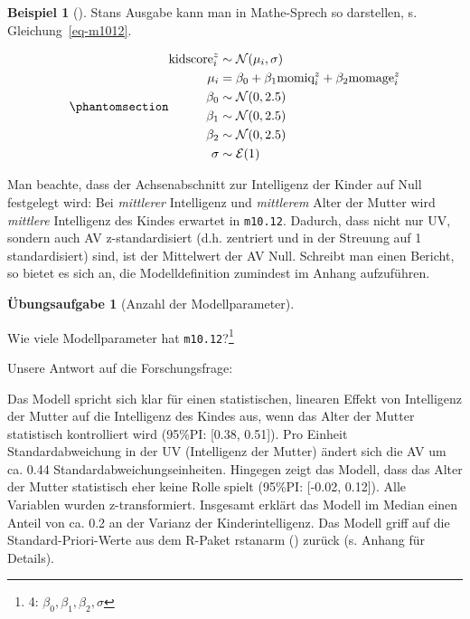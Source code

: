 \documentclass[
  ngerman,
  letterpaper,
  twoside,
  open=any]{scrbook}
\theoremstyle{definition}
\newtheorem{example}{Beispiel}[chapter]
\theoremstyle{plain}
\theoremstyle{definition}
\newtheorem{exercise}{Übungsaufgabe}[chapter]
\theoremstyle{definition}
\theoremstyle{remark}
\begin{document}
\begin{example}[]
Stans Ausgabe kann man in Mathe-Sprech so darstellen, s.
Gleichung~\ref{eq-m1012}.

\begin{equation}\protect\phantomsection\label{eq-m1012}{
\begin{aligned}
\text{kidscore}^z_i  &\sim \mathcal{N}(\mu_i,\sigma)\\
\mu_i &= \beta_0 + \beta_1\text{momiq}_i^z + \beta_2\text{momage}_i^z \\
\beta_0 &\sim \mathcal{N}(0,2.5)\\
\beta_1 &\sim \mathcal{N}(0,2.5)\\
\beta_2 &\sim \mathcal{N}(0,2.5)\\
\sigma &\sim \mathcal{E}(1)
\end{aligned}
}\end{equation}

Man beachte, dass der Achsenabschnitt zur Intelligenz der Kinder auf
Null festgelegt wird: Bei \emph{mittlerer} Intelligenz und
\emph{mittlerem} Alter der Mutter wird \emph{mittlere} Intelligenz des
Kindes erwartet in \texttt{m10.12}. Dadurch, dass nicht nur UV, sondern
auch AV z-standardisiert (d.h. zentriert und in der Streuung auf 1
standardisiert) sind, ist der Mittelwert der AV Null. Schreibt man einen
Bericht, so bietet es sich an, die Modelldefinition zumindest im Anhang
aufzuführen.

\begin{exercise}[Anzahl der
Modellparameter]\protect\hypertarget{exr-anz-mod-m1011}{}\label{exr-anz-mod-m1011}

Wie viele Modellparameter hat \texttt{m10.12}?\footnote{4:
  \(\beta_0, \beta_1, \beta_2, \sigma\)}

\end{exercise}

Unsere Antwort auf die Forschungsfrage:

\begin{displayquote}
Das Modell spricht sich klar für einen statistischen, linearen Effekt
von Intelligenz der Mutter auf die Intelligenz des Kindes aus, wenn das
Alter der Mutter statistisch kontrolliert wird (95\%PI: {[}0.38,
0.51{]}). Pro Einheit Standardabweichung in der UV (Intelligenz der
Mutter) ändert sich die AV um ca. 0.44 Standardabweichungseinheiten.
Hingegen zeigt das Modell, dass das Alter der Mutter statistisch eher
keine Rolle spielt (95\%PI: {[}-0.02, 0.12{]}). Alle Variablen wurden
z-transformiert. Insgesamt erklärt das Modell im Median einen Anteil von
ca. 0.2 an der Varianz der Kinderintelligenz. Das Modell griff auf die
Standard-Priori-Werte aus dem R-Paket rstanarm
() zurück (s. Anhang
für Details).
\end{displayquote}


\end{example}
\end{document}
